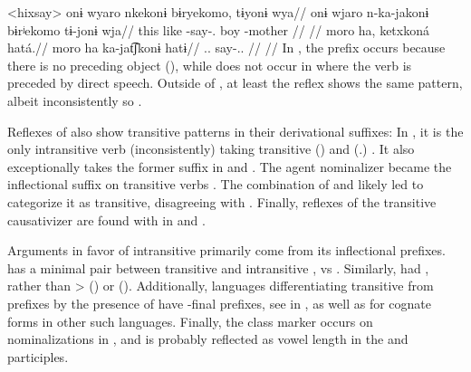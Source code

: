\pex<hixsay>\hixka
{}
\begingl
\glpreamble onɨ wyaro nkekonɨ bɨryekomo, tɨyonɨ wya//
\gla onɨ wjaro n-ka-jakonɨ bɨrʲekomo tɨ-jonɨ wja//
\glb this like -say-. boy -mother //
\glft {} \parencite[][36]{hixkaryanaderby1985}//
\endgl
{}
\begingl
\glpreamble moro ha, ketxkoná hatá.//
\gla moro ha ka-jat͡ʃkonɨ hatɨ//
\glb {}..  say-.. //
\glft {} \parencite[][14]{derbyshire1965textos}//
\endgl
\xe
In , the prefix  occurs because there is no preceding object (), while does not occur in  where the verb is preceded by direct speech.
Outside of \hixka, at least the \trio reflex shows the same pattern, albeit inconsistently so \parencite[267]{triocarlin2004}.

Reflexes of   also show transitive patterns in their derivational suffixes:
In \trio, it is the only intransitive verb (inconsistently) taking transitive  () and  (.) \parencite[263, 169]{triomeira1999}.
It also exceptionally takes the former suffix in \kalina \parencite[82]{courtz2008carib} and \wayana \parencite[258]{wayanatavares2005}.
The agent nominalizer  became the \panare inflectional suffix  on transitive verbs \parencite[184--185]{gildea1998}.
The combination of  and  likely led \textcite[214]{panarepayne2013} to categorize it as transitive, disagreeing with  \textcite[102]{mattei1994diccionario}.
Finally, reflexes of the transitive causativizer  \parencite{gildea2015valency} are found with  in \apalai \parencite[51]{koehn1986apalai} and \waiwai \parencite[52]{waiwaihawkins1998}.

Arguments in favor of intransitive  primarily come from its inflectional prefixes.
\kalina has a minimal pair between transitive   and intransitive  ,   vs   \parencite[288, 45]{courtz2008carib}.
Similarly, \PPek {}  had   , rather than >  (\bakairi) or  (\PXin).
Additionally, languages differentiating transitive from  prefixes by the presence of  \parencite[495]{meira2010origin} have -final prefixes, see \akuriyo in , as well as \textcites[294]{triomeira1999}[195]{wayanatavares2005}[288]{ikpengpacheco2001}[150]{alves2017arara}[168]{hoff1968carib} for cognate forms in other such languages.
Finally, the  class marker  occurs on nominalizations in \kalina {}, and is probably reflected as vowel length in the \trio \parencite[333]{triomeira1999} and \wayana \parencite[196]{wayanatavares2005} participles.

